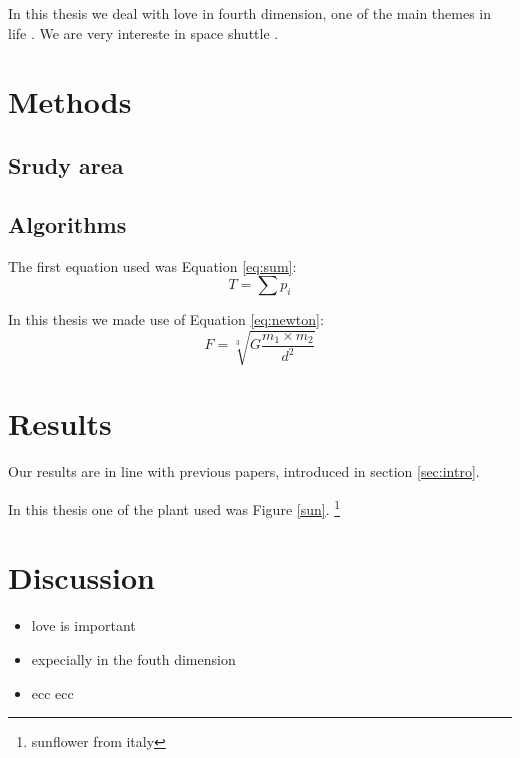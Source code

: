 \documentclass[12pt]{article} %
\begin{document}
In this thesis we deal with love in fourth dimension, one of the main themes in life \cite{Berscheid2010}. We are very intereste in space shuttle \citep{Paul2013}.


\section{Methods}
\subsection{Srudy area}
\subsection{Algorithms}

The first equation used was Equation \ref{eq:sum}:
\begin{equation} %
    T = \sum p_i
    \label{eq:sum} %
\end{equation} %

\noindent In this thesis we made use of Equation \ref{eq:newton}:
\begin{equation}
    F = \sqrt[3]{G \frac{m_1 \times m_2}{d^2}} %
    \label{eq:newton}
\end{equation}


\section{Results}
Our results are in line with previous papers, introduced in section \ref{sec:intro}. %

In this thesis one of the plant used was Figure \ref{sun}.
\footnote{sunflower from italy} %

\section{Discussion}
\begin{itemize}
    \item love is important
    \item expecially in the fouth dimension
    \item ecc ecc
\end{itemize}
\end{document}
